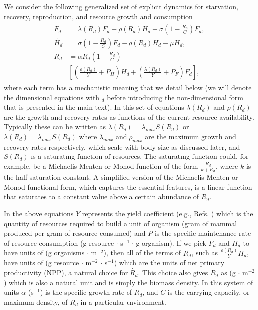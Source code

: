 \documentclass[twocolumn,preprintnumbers,amsmath,amssymb,superscriptaddress]{revtex4}
\begin{document}
\begin{bibunit}[unsrt]
We consider the following generalized set of explicit dynamics for starvation, recovery, reproduction, and resource growth and consumption
\begin{align}
\begin{split}
\dot{F_{d}} &= \lambda\left(R_{d}\right) F_{d} + \rho\left(R_{d}\right)H_{d} - \sigma \left(1-\frac{R_{d}}{C}\right)F_{d},  \\
\dot{H_{d}} &= \sigma \left(1-\frac{R_{d}}{C}\right)F_{d} - \rho\left(R_{d}\right)H_{d} - \mu H_{d},  \\
\dot{R_{d}} &= \alpha R_{d}\left(1-\frac{R_{d}}{C}\right) - \\
&\left[\left(\frac{\rho\left(R_{d}\right)}{Y}+P_{H}\right)H_{d}+\left(\frac{\lambda\left(R_{d}\right)}{Y}+P_{F}\right)F_{d}\right],
\end{split}
\end{align}
where each term has a mechanistic meaning that we detail below (we will denote the dimensional equations with $_{d}$ before introducing the non-dimensional form that is presented in the main text).
In this set of equations $\lambda\left(R_{d}\right)$ and $\rho\left(R_{d}\right)$ are the growth and recovery rates as functions of the current resource availability. Typically these can be written as $\lambda\left(R_{d}\right)=\lambda_{max}S\left(R_{d}\right)$ or $\lambda\left(R_{d}\right)=\lambda_{max}S\left(R_{d}\right)$ where $\lambda_{max}$ and $\rho_{max}$ are the maximum growth and recovery rates respectively, which scale with body size as discussed later, and $S\left(R_{d}\right)$ is a saturating function of resources. The saturating function could, for example, be a Michaelis-Menten or Monod function of the form $\frac{R_{d}}{k+R_{d}}$, where $k$ is the half-saturation constant.
A simplified version of the Michaelis-Menten or Monod functional form, which captures the essential features, is a linear function that saturates to a constant value above a certain abundance of $R_{d}$.

In the above equations $Y$ represents the yield coefficient (e.g., Refs. \cite{pirt,Heijnen}) which is the quantity of resources required to build a unit of organism (gram of mammal produced per gram of resource consumed) and $P$ is the specific maintenance rate of resource consumption (g resource $\cdot$ s$^{-1}$ $\cdot$ g organism). If we pick $F_{d}$ and $H_{d}$ to have units of (g organisms $\cdot$ m$^{-2}$), then all of the terms of $\dot{R_{d}}$, such as $\frac{\rho\left(R_{d}\right)}{Y}H_{d}$, have units of (g resource $\cdot$ m$^{-2}$ $\cdot$ s$^{-1}$) which are the units of net primary productivity (NPP), a natural choice for $\dot{R_{d}}$. This choice also gives $R_{d}$ as (g $\cdot$ m$^{-2}$) which is also a natural unit and is simply the biomass density. In this system of units $\alpha$ (s$^{-1}$) is the specific growth rate of $R_{d}$, and $C$ is the carrying capacity, or maximum density, of $R_{d}$ in a particular environment.


\end{bibunit}
\end{document}
